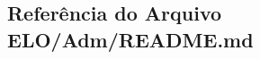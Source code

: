 \hypertarget{ELO_2Adm_2README_8md}{}\subsection{Referência do Arquivo E\+L\+O/\+Adm/\+R\+E\+A\+D\+M\+E.md}
\label{ELO_2Adm_2README_8md}
